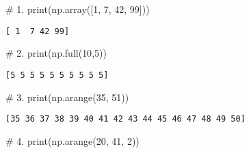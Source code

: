 \documentclass[
  letterpaper,
  DIV=11,
  numbers=noendperiod]{scrreprt}
\newenvironment{Shaded}{\begin{snugshade}}{\end{snugshade}}
\newcommand{\BuiltInTok}[1]{\textcolor[rgb]{0.00,0.23,0.31}{#1}}
\newcommand{\CommentTok}[1]{\textcolor[rgb]{0.37,0.37,0.37}{#1}}
\newcommand{\DecValTok}[1]{\textcolor[rgb]{0.68,0.00,0.00}{#1}}
\newcommand{\NormalTok}[1]{\textcolor[rgb]{0.00,0.23,0.31}{#1}}
\begin{document}
\begin{tcolorbox}
\begin{tcolorbox}
\begin{tcolorbox}[enhanced jigsaw, breakable, opacityback=0, left=2mm, coltitle=black, leftrule=.75mm, colframe=quarto-callout-caution-color-frame, opacitybacktitle=0.6, toprule=.15mm, bottomtitle=1mm, titlerule=0mm, toptitle=1mm, title={Lösung}, colbacktitle=quarto-callout-caution-color!10!white, arc=.35mm, bottomrule=.15mm, rightrule=.15mm, colback=white]

\begin{Shaded}
\begin{Highlighting}[]
\CommentTok{\# 1. }
\BuiltInTok{print}\NormalTok{(np.array([}\DecValTok{1}\NormalTok{, }\DecValTok{7}\NormalTok{, }\DecValTok{42}\NormalTok{, }\DecValTok{99}\NormalTok{]))}
\end{Highlighting}
\end{Shaded}

\begin{verbatim}
[ 1  7 42 99]
\end{verbatim}

\begin{Shaded}
\begin{Highlighting}[]
\CommentTok{\# 2. }
\BuiltInTok{print}\NormalTok{(np.full(}\DecValTok{10}\NormalTok{,}\DecValTok{5}\NormalTok{))}
\end{Highlighting}
\end{Shaded}

\begin{verbatim}
[5 5 5 5 5 5 5 5 5 5]
\end{verbatim}

\begin{Shaded}
\begin{Highlighting}[]
\CommentTok{\# 3. }
\BuiltInTok{print}\NormalTok{(np.arange(}\DecValTok{35}\NormalTok{, }\DecValTok{51}\NormalTok{))}
\end{Highlighting}
\end{Shaded}

\begin{verbatim}
[35 36 37 38 39 40 41 42 43 44 45 46 47 48 49 50]
\end{verbatim}

\begin{Shaded}
\begin{Highlighting}[]
\CommentTok{\# 4. }
\BuiltInTok{print}\NormalTok{(np.arange(}\DecValTok{20}\NormalTok{, }\DecValTok{41}\NormalTok{, }\DecValTok{2}\NormalTok{))}
\end{Highlighting}
\end{Shaded}


\end{tcolorbox}
\end{tcolorbox}
\end{tcolorbox}
\end{document}
